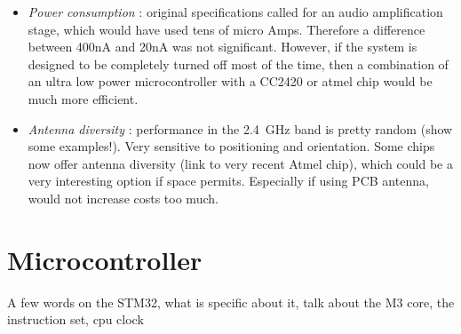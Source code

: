 \begin{itemize}
  \item \emph{Power consumption} : original specifications called for an audio
    amplification stage, which would have used tens of micro Amps.
    Therefore a difference between 400nA and 20nA was not significant. However,
    if the system is designed to be completely turned off most of the time, then
    a combination of an ultra low power microcontroller with a CC2420 or atmel
    chip would be much more efficient.
  \item \emph{Antenna diversity} : performance in the \SI{2.4}{GHz} band is pretty
    random (show some examples!). Very sensitive to positioning and orientation.
    Some chips now offer antenna diversity (link to very recent Atmel chip),
    which could be a very interesting option if space permits. Especially if
    using PCB antenna, would not increase costs too much.
\end{itemize}


\section{Microcontroller}

A few words on the STM32, what is specific about it, talk about the M3 core, the
instruction set, cpu clock

